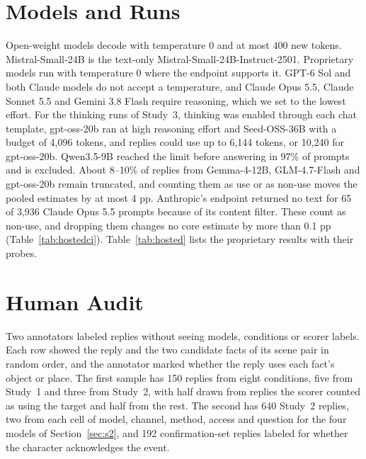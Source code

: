 \appendix
\raggedbottom
\setcounter{topnumber}{4}\setcounter{bottomnumber}{3}\setcounter{totalnumber}{6}\setcounter{dbltopnumber}{4}
\renewcommand{\topfraction}{0.95}\renewcommand{\bottomfraction}{0.9}\renewcommand{\textfraction}{0.05}\renewcommand{\floatpagefraction}{0.6}
\renewcommand{\dbltopfraction}{0.95}\renewcommand{\dblfloatpagefraction}{0.6}
\makeatletter\setlength{\@fptop}{0pt}\setlength{\@fpsep}{10pt}\setlength{\@fpbot}{0pt plus 1fil}\setlength{\@dblfptop}{0pt}\setlength{\@dblfpsep}{14pt}\setlength{\@dblfpbot}{0pt plus 1fil}\makeatother
\section{Models and Runs}
\label{app:models}
Open-weight models decode with temperature 0 and at most 400 new tokens. Mistral-Small-24B is the text-only Mistral-Small-24B-Instruct-2501. Proprietary models run with temperature 0 where the endpoint supports it. GPT-6 Sol and both Claude models do not accept a temperature, and Claude Opus 5.5, Claude Sonnet 5.5 and Gemini 3.8 Flash require reasoning, which we set to the lowest effort. For the thinking runs of Study~3, thinking was enabled through each chat template, gpt-oss-20b ran at high reasoning effort and Seed-OSS-36B with a budget of 4,096 tokens, and replies could use up to 6,144 tokens, or 10,240 for gpt-oss-20b. Qwen3.5-9B reached the limit before answering in 97\% of prompts and is excluded. About 8--10\% of replies from Gemma-4-12B, GLM-4.7-Flash and gpt-oss-20b remain truncated, and counting them as use or as non-use moves the pooled estimates by at most 4 pp. Anthropic's endpoint returned no text for 65 of 3,936 Claude Opus 5.5 prompts because of its content filter. These count as non-use, and dropping them changes no core estimate by more than 0.1 pp (Table~\ref{tab:hostedci}). Table~\ref{tab:hosted} lists the proprietary results with their probes.


\FloatBarrier
\section{Human Audit}
\label{app:audit}
Two annotators labeled replies without seeing models, conditions or scorer labels. Each row showed the reply and the two candidate facts of its scene pair in random order, and the annotator marked whether the reply uses each fact's object or place. The first sample has 150 replies from eight conditions, five from Study~1 and three from Study~2, with half drawn from replies the scorer counted as using the target and half from the rest. The second has 640 Study~2 replies, two from each cell of model, channel, method, access and question for the four models of Section~\ref{sec:s2}, and 192 confirmation-set replies labeled for whether the character acknowledges the event.


